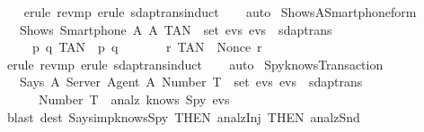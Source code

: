 \begin{isabellebody}
  \isadelimproof
  \isanewline
  \ \ %
  \endisadelimproof
  \isatagproof
  \isamarkupfalse%
  \ {\isacharparenleft}erule\ rev{\isacharunderscore}mp{\isacharcomma}\ erule\ sdaptrans{\isachardot}induct{\isacharparenright}\isanewline
  \ \ \isamarkupfalse%
  \ {\isacharparenleft}auto{\isacharparenright}\isanewline
  \isamarkupfalse%
  \endisatagproof
  {\isafoldproof}%
  \isadelimproof
  \isanewline
  \endisadelimproof
  \isanewline
  \isamarkupfalse%
  \ Shows{\isacharunderscore}A{\isacharunderscore}Smartphone{\isacharunderscore}form{\isacharunderscore}{}\ {\isacharcolon}\isanewline
  \ \ {\isachardoublequoteopen}{\isasymlbrakk}\ Shows\ {\isacharparenleft}Smartphone\ A{\isacharparenright}\ A\ TAN\ {\isasymin}\ set\ evs{\isacharsemicolon}\ evs\ {\isasymin}\ sdaptrans{\isacharsemicolon}\isanewline
  \ \ \ \ {\isasymforall}\ p\ q{\isachardot}\ TAN\ {\isasymnoteq}\ {\isasymlbrace}p{\isacharcomma}\ q{\isasymrbrace}\ {\isasymrbrakk}\isanewline
  \ \ \ \ {\isasymLongrightarrow}\ {\isasymexists}\ r{\isachardot}\ TAN\ {\isacharequal}\ {\isacharparenleft}Nonce\ r{\isacharparenright}{\isachardoublequoteclose}\isanewline
  \isadelimproof
  \isanewline
  \ \ %
  \endisadelimproof
  \isatagproof
  \isamarkupfalse%
  \ {\isacharparenleft}erule\ rev{\isacharunderscore}mp{\isacharcomma}\ erule\ sdaptrans{\isachardot}induct{\isacharparenright}\isanewline
  \ \ \isamarkupfalse%
  \ {\isacharparenleft}auto{\isacharparenright}\isanewline
  \isamarkupfalse%
  \endisatagproof
  {\isafoldproof}%
  \isadelimproof
  \endisadelimproof
  \isadelimdocument
  \endisadelimdocument
  \isatagdocument
  \isamarkuptrue%
  \endisatagdocument
  {\isafolddocument}%
  \isadelimdocument
  \endisadelimdocument
  \isamarkupfalse%
  \ Spy{\isacharunderscore}knows{\isacharunderscore}Transaction\ {\isacharcolon}\isanewline
  \ \ {\isachardoublequoteopen}{\isasymlbrakk}\ Says\ A\ Server\ {\isasymlbrace}Agent\ A{\isacharcomma}\ Number\ T{\isasymrbrace}\ {\isasymin}\ set\ evs{\isacharsemicolon}\ evs\ {\isasymin}\ sdaptrans\ {\isasymrbrakk}\isanewline
  \ \ \ \ \ {\isasymLongrightarrow}\ Number\ T\ {\isasymin}\ analz\ {\isacharparenleft}knows\ Spy\ evs{\isacharparenright}{\isachardoublequoteclose}\isanewline
  \isadelimproof
  \endisadelimproof
  \isatagproof
  \isamarkupfalse%
  \ {\isacharparenleft}blast\ dest{\isacharbang}{\isacharcolon}\ Says{\isacharunderscore}imp{\isacharunderscore}knows{\isacharunderscore}Spy\ {\isacharbrackleft}THEN\ analz{\isachardot}Inj{\isacharcomma}\ THEN\ analz{\isachardot}Snd{\isacharbrackright}{\isacharparenright}%

\end{isabellebody}
